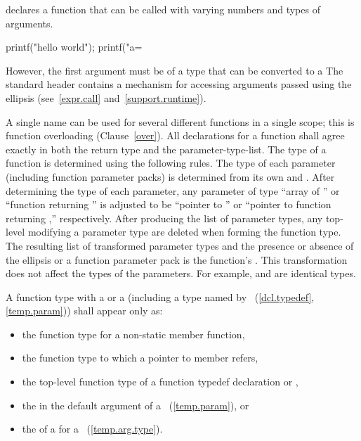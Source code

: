 declares a function that can be called with varying numbers and types of arguments.

\begin{codeblock}
printf("hello world");
printf("a=%
\end{codeblock}

However, the first argument must be of a type
that can be converted to a
\exitexample
\enternote
The standard header
%
contains a mechanism for accessing arguments passed using the ellipsis
(see~\ref{expr.call} and~\ref{support.runtime}).
\exitnote

\pnum
{}%
%
A single name can be used for several different functions in a single scope;
this is function overloading (Clause~\ref{over}).
All declarations for a function shall agree exactly
in both the return type and the parameter-type-list.
The type of a function is determined using the following rules.
The type of each parameter (including function parameter packs) is
determined from its own
and
.
After determining the type of each parameter, any parameter of type ``array of
%
%
''
%
%
or ``function returning
''
is adjusted to be ``pointer to
''
or ``pointer to function returning
,''
respectively.
After producing the list of parameter types,
any top-level
modifying a parameter type are deleted
when forming the function type.
The resulting list of transformed parameter types
and the presence or absence of the ellipsis or a function parameter pack
is the function's
.
\enternote This transformation does not affect the types of the parameters.
For example,  and
 are identical types. \exitnote

\pnum
A function type with a  or a
 (including a type named by
~(\ref{dcl.typedef}, \ref{temp.param}))
shall appear only as:
\begin{itemize}
\item the function type for a non-static member function,

\item the function type to which a pointer to member refers,

\item the top-level function type of a function typedef declaration
or ,

\item the  in the default argument of a
~(\ref{temp.param}), or

\item the  of a  for a
~(\ref{temp.arg.type}).
\end{itemize}
\enterexample

